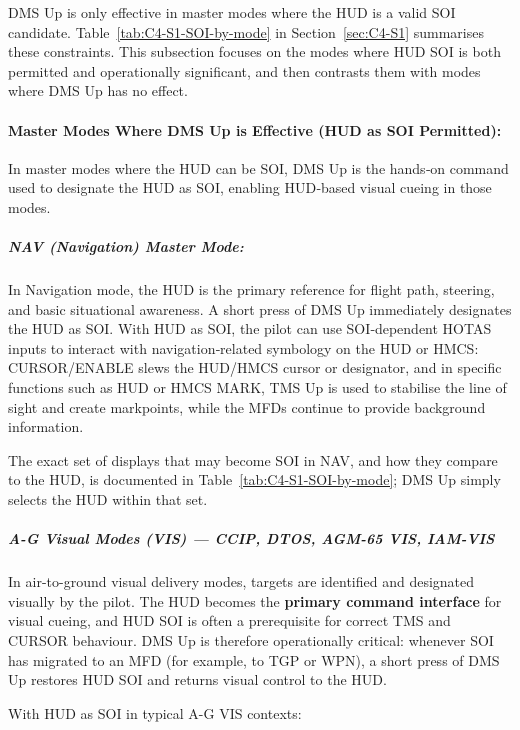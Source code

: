 \documentclass[11pt,a4paper]{article}
\begin{document}
DMS Up is only effective in master modes where the HUD is a valid SOI candidate. Table~\ref{tab:C4-S1-SOI-by-mode} in Section~\ref{sec:C4-S1} summarises these constraints. This subsection focuses on the modes where HUD SOI is both permitted and operationally significant, and then contrasts them with modes where DMS Up has no effect.

\paragraph*{Master Modes Where DMS Up is Effective (HUD as SOI Permitted):}
In master modes where the HUD can be SOI, DMS Up is the hands‑on command used to designate the HUD as SOI, enabling HUD‑based visual cueing in those modes.

\subparagraph*{NAV (Navigation) Master Mode:}
In Navigation mode, the HUD is the primary reference for flight path, steering, and basic situational awareness. A short press of DMS Up immediately designates the HUD as SOI. With HUD as SOI, the pilot can use SOI‑dependent HOTAS inputs to interact with navigation‑related symbology on the HUD or HMCS: CURSOR/ENABLE slews the HUD/HMCS cursor or designator, and in specific functions such as HUD or HMCS MARK, TMS Up is used to stabilise the line of sight and create markpoints, while the MFDs continue to provide background information.

The exact set of displays that may become SOI in NAV, and how they compare to the HUD, is documented in Table~\ref{tab:C4-S1-SOI-by-mode}; DMS Up simply selects the HUD within that set.

\subparagraph*{A-G Visual Modes (VIS) --- CCIP, DTOS, AGM-65 VIS, IAM-VIS}
In air-to-ground visual delivery modes, targets are identified and designated visually by the pilot. The HUD becomes the \textbf{primary command interface} for visual cueing, and HUD SOI is often a prerequisite for correct TMS and CURSOR behaviour. DMS Up is therefore operationally critical: whenever SOI has migrated to an MFD (for example, to TGP or WPN), a short press of DMS Up restores HUD SOI and returns visual control to the HUD.

With HUD as SOI in typical A-G VIS contexts:
\end{document}
